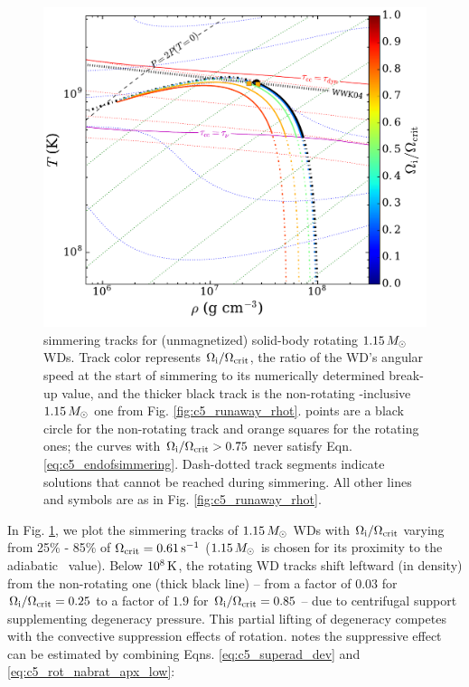 \begin{figure}
\centering
\includegraphics[angle=0,width=0.8\columnwidth]{chapter5_zhu+16/figures/rot_stev_1pt15_rhot.pdf}
\caption{simmering tracks for (unmagnetized) solid-body rotating $1.15\,\Msun$ WDs.  Track color represents $\Ominit/\Omcrit$, the ratio of the WD's angular speed at the start of simmering to its numerically determined break-up value, and the thicker black track is the non-rotating \dnabconv-inclusive $1.15\,\Msun$ one from Fig. \ref{fig:c5_runaway_rhot}.  \citeal{wooswk04} points are a black circle for the non-rotating track and orange squares for the rotating ones; the curves with $\Ominit/\Omcrit > 0.75$ never satisfy Eqn. \ref{eq:c5_endofsimmering}.  Dash-dotted track segments indicate solutions that cannot be reached during simmering.  All other lines and symbols are as in Fig. \ref{fig:c5_runaway_rhot}.}
\label{fig:c5_rot_stev_1pt15_rhot}
\end{figure}


In Fig. \ref{fig:c5_rot_stev_1pt15_rhot}, we plot the simmering tracks of $1.15\,\Msun$ WDs with $\Ominit/\Omcrit$ varying from 25\% - 85\% of $\Omcrit = 0.61\,\mrm{s}^{-1}$ ($1.15\,\Msun$ is chosen for its proximity to the adiabatic \Mcrit\ value).  Below $10^{8}\,\mathrm{K}$, the rotating WD tracks shift leftward (in density) from the non-rotating one (thick black line) -- from a factor of $0.03$ for $\Ominit/\Omcrit = 0.25$ to a factor of $1.9$ for $\Ominit/\Omcrit = 0.85$ -- due to centrifugal support supplementing degeneracy pressure.  This partial lifting of degeneracy competes with the convective suppression effects of rotation.  \citeal{stev79} notes the suppressive effect can be estimated by combining Eqns. \ref{eq:c5_superad_dev} and \ref{eq:c5_rot_nabrat_apx_low}:

